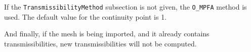 If the \texttt{TransmissibilityMethod} subsection is not given, the
\texttt{O\_MPFA} method is used. The default value for the continuity
point is 1.

And finally, if the mesh is being imported, and it already contains
transmissibilities, new transmissibilities will not be computed.

